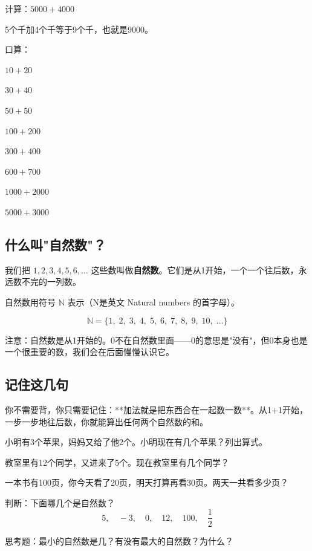 \begin{example}
计算：$5000+4000$
\end{example}
\begin{solution}
5个千加4个千等于9个千，也就是9000。
\end{solution}

\begin{exercise}
\item 口算：
  \begin{subexercise}
    \item $10+20$
    \item $30+40$
    \item $50+50$
    \item $100+200$
    \item $300+400$
    \item $600+700$
    \item $1000+2000$
    \item $5000+3000$
  \end{subexercise}
\end{exercise}

\subsection*{什么叫"自然数"？}

我们把 $1,2,3,4,5,6,\ldots$ 这些数叫做\textbf{自然数}。它们是从1开始，一个一个往后数，永远数不完的一列数。

自然数用符号 $\mathbb{N}$ 表示（N是英文 Natural numbers 的首字母）。

\[
\mathbb{N} = \{1,\;2,\;3,\;4,\;5,\;6,\;7,\;8,\;9,\;10,\;\ldots\}
\]

注意：自然数是从1开始的。0不在自然数里面——0的意思是"没有"，但0本身也是一个很重要的数，我们会在后面慢慢认识它。

\subsection*{记住这几句}

你不需要背，你只需要记住：**加法就是把东西合在一起数一数**。从1+1开始，一步一步地往后数，你就能算出任何两个自然数的和。

\begin{exercise}
\item 小明有3个苹果，妈妈又给了他2个。小明现在有几个苹果？列出算式。

\item 教室里有12个同学，又进来了5个。现在教室里有几个同学？

\item 一本书有100页，你今天看了20页，明天打算再看30页。两天一共看多少页？

\item 判断：下面哪几个是自然数？
  \[
  5,\quad -3,\quad 0,\quad 12,\quad 100,\quad \frac{1}{2}
  \]

\item 思考题：最小的自然数是几？有没有最大的自然数？为什么？
\end{exercise}

